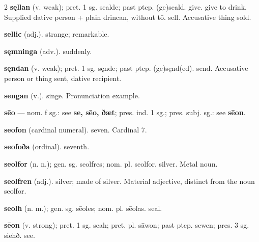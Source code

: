 \begin{multicols*}{2}
\textbf{sęllan} (v. weak); pret. 1 sg. sealde; past ptcp. (ge)seald. give. give to drink. Supplied dative person + plain drincan, without tō. sell. Accusative thing sold.\par
\textbf{sellic} (adj.). strange; remarkable.\par
\textbf{sęmninga} (adv.). suddenly.\par
\textbf{sęndan} (v. weak); pret. 1 sg. sęnde; past ptcp. (ge)sęnd(ed). send. Accusative person or thing sent, dative recipient.\par
\textbf{sengan} (v.). singe. Pronunciation example.\par
\textbf{sēo} — nom. f sg.: see \textbf{se, sēo, ðæt}; pres. ind. 1 sg.; pres. subj. sg.: see \textbf{sēon}.\par
\textbf{seofon} (cardinal numeral). seven. Cardinal 7.\par
\textbf{seofoða} (ordinal). seventh.\par
\textbf{seolfor} (n. n.); gen. sg. seolfres; nom. pl. seolfor. silver. Metal noun.\par
\textbf{seolfren} (adj.). silver; made of silver. Material adjective, distinct from the noun seolfor.\par
\textbf{seolh} (n. m.); gen. sg. sēoles; nom. pl. sēolas. seal.\par
\textbf{sēon} (v. strong); pret. 1 sg. seah; pret. pl. sāwon; past ptcp. sewen; pres. 3 sg. siehð. see.\par

\end{multicols*}
